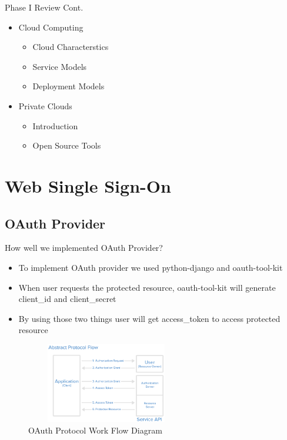 \documentclass[10pt,xcolor=dvipsnames]{beamer}
\begin{document}
\begin{frame}{Phase I Review Cont.}
\begin{itemize}
		\item Cloud Computing
		\begin{itemize}
			\item 	Cloud Characterstics
			\item Service Models 
			\item Deployment Models 
		\end{itemize}		 
		\item Private Clouds 
		\begin{itemize}
		 	\item Introduction 
			\item Open Source Tools 
		\end{itemize}			

	\end{itemize}
\end{frame}
\section{Web Single Sign-On}

\subsection{OAuth Provider}
\begin{frame}{How well we implemented OAuth Provider?}
	\begin{itemize}
		\item To implement OAuth provider we used python-django and oauth-tool-kit
		\item When user requests the protected resource, oauth-tool-kit will generate client\_id and client\_secret 
		\item By using those two things user will get access\_token to access protected resource
	\end{itemize}
	  
\begin{figure}
\begin{center}
\includegraphics[width=7cm,height=3.5cm]{abstract_flow}
\caption{OAuth Protocol Work Flow Diagram\label{fig:OAuth Protocol Work Flow Diagram}}
\end{center}

\end{figure}
\end{frame}
\end{document}

